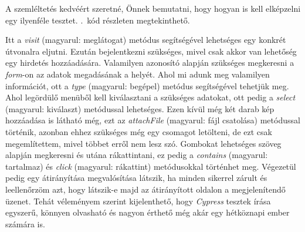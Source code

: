 \documentclass[]{thesis-ekf}
\theoremstyle{definition}
\theoremstyle{remark}
\begin{document}
		A szemléltetés kedvéért szeretné, Önnek bemutatni, hogy hogyan is kell elképzelni egy ilyenféle tesztet. .~kód részleten megtekinthető.
		
		
		
		Itt a \emph{visit} (magyarul: meglátogat) metódus segítségével lehetséges egy konkrét útvonalra eljutni. Ezután bejelentkezni szükséges, mivel csak akkor van lehetőség egy hirdetés hozzáadására. Valamilyen azonosító alapján szükséges megkeresni a \emph{form}-on az adatok megadásának a helyét. Ahol mi adunk meg valamilyen információt, ott a \emph{type} (magyarul: begépel) metódus segítségével tehetjük meg. Ahol legördülő menüből kell kiválasztani a szükséges adatokat, ott pedig a \emph{select} (magyarul: kiválaszt) metódussal lehetséges. Ezen kívül még két darab kép hozzáadása is látható még, ezt az \emph{attachFile} (magyarul: fájl csatolása) metódussal történik, azonban ehhez szükséges még egy csomagot letölteni, de ezt csak megemlítettem, mivel többet erről nem lesz szó. Gombokat lehetséges szöveg alapján megkeresni és utána rákattintani, ez pedig a \emph{contains} (magyarul: tartalmaz) és \emph{click} (magyarul: rákattint) metódusokkal történhet meg. Végezetül pedig egy átirányítása megvalósítása látszik, ha minden sikerrel zárult és leellenőrzöm azt, hogy látszik-e majd az átirányított oldalon a megjelenítendő üzenet. Tehát véleményem szerint kijelenthető, hogy \emph{Cypress} tesztek írása egyszerű, könnyen olvasható és nagyon érthető még akár egy hétköznapi ember számára is.
\end{document}
